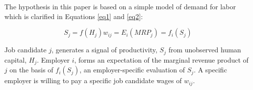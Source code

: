 \documentclass[review]{elsarticle}
\begin{document}

The hypothesis in this paper is based on a simple model of demand for labor which is clarified in Equations \ref{eq1} and \ref{eq2}:

\begin{subequations}
    \begin{equation}
        S_j = f(H_j)
        \label{eq1}
    \end{equation}
    \begin{equation}
        w_{ij} = E_i(MRP_j) = f_i(S_j)
        \label{eq2}
    \end{equation}
\end{subequations}

Job candidate $j$, generates a signal of productivity, $S_j$ from unobserved human capital, $H_j$.
Employer $i$, forms an expectation of the marginal revenue product of $j$ on the basis of $f_i(S_j)$, an employer-specific evaluation of $S_j$.
A specific employer is willing to pay a specific job candidate wages of $w_{ij}$.
\end{document}
